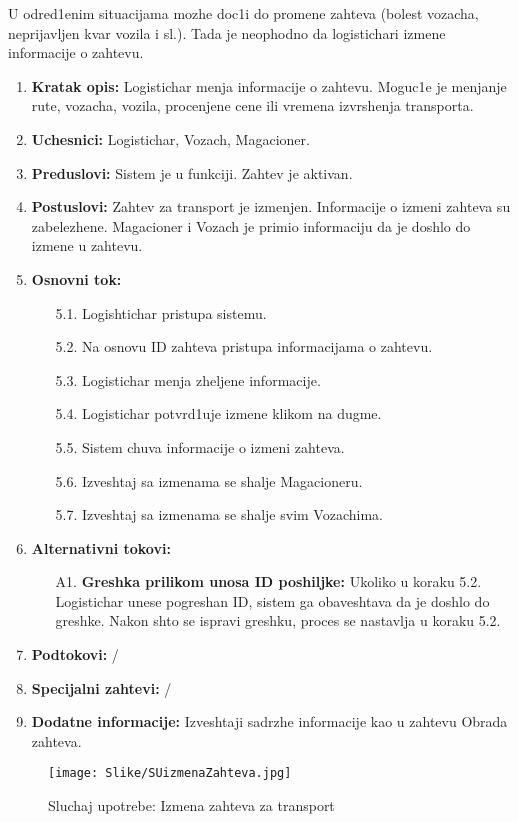 
U odred1enim situacijama mozhe doc1i do promene zahteva (bolest vozacha, neprijavljen kvar vozila i sl.). Tada je neophodno da logistichari izmene informacije o zahtevu.

\begin{enumerate}
    \item \textbf{Kratak opis:} Logistichar menja informacije o zahtevu. Moguc1e je menjanje rute, vozacha, vozila, procenjene cene ili vremena izvrshenja transporta. 
    
    \item \textbf{Uchesnici:} Logistichar, Vozach, Magacioner.
    \item \textbf{Preduslovi:} Sistem je u funkciji. Zahtev je aktivan.
    \item \textbf{Postuslovi:} Zahtev za transport je izmenjen. Informacije o izmeni zahteva su zabelezhene. Magacioner i Vozach je primio informaciju da je doshlo do izmene u zahtevu.
    \item \textbf{Osnovni tok:}
        \begin{enumerate}
            \item[5.1.] Logishtichar pristupa sistemu. 
            \item[5.2.] Na osnovu ID zahteva pristupa informacijama o zahtevu.
            
            \item[5.3.] Logistichar menja zheljene informacije. 
            \item[5.4.] Logistichar potvrd1uje izmene klikom na dugme.
            
            \item[5.5.] Sistem chuva informacije o izmeni zahteva.
            \item[5.6.] Izveshtaj sa izmenama se shalje Magacioneru.
            \item[5.7.] Izveshtaj sa izmenama se shalje svim Vozachima.
            
        \end{enumerate}
    \item \textbf{Alternativni tokovi:}
            \begin{enumerate}
                \item [A1.] \textbf{Greshka prilikom unosa ID poshiljke: }
                Ukoliko u koraku 5.2. Logistichar unese pogreshan ID, sistem ga obaveshtava da je doshlo do greshke. 
                Nakon shto se ispravi greshku, proces se nastavlja u koraku 5.2.
            \end{enumerate}
        
    \item \textbf{Podtokovi:} /
    \item \textbf{Specijalni zahtevi:} /
    \item \textbf{Dodatne informacije:} Izveshtaji sadrzhe informacije kao u zahtevu Obrada zahteva.
    
\end{enumerate}



\begin{figure}[h!]
    \texttt{[image: Slike/SUizmenaZahteva.jpg]}
    \centering
    \caption{Sluchaj upotrebe: Izmena zahteva za transport}
    \label{dsizmena}
\end{figure}    

\newpage


